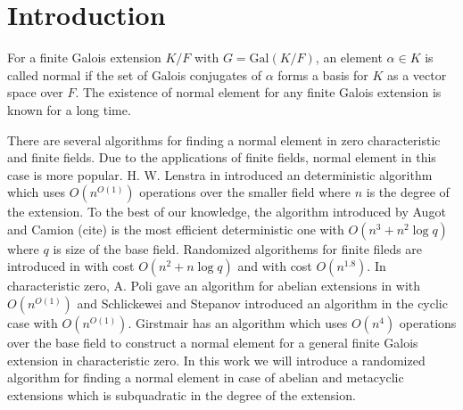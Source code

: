 \documentclass[sigconf]{acmart}
\theoremstyle{acmplain}
\begin{document}
\maketitle

\section{Introduction}

For a finite Galois extension $K/F$ with $G = \mathrm{Gal}(K/F)$, an element $\alpha \in K$
is called normal if the set of Galois conjugates of $\alpha$ forms a basis for $K$ as a
 vector space over $F$. The existence of normal element for any finite Galois extension is 
 known for a long time.

There are several algorithms for finding a normal element in zero characteristic and finite fields. Due to the applications of
finite fields, normal element in this case is more popular. H. W. Lenstra in \cite{LenstraNormal} introduced an deterministic 
algorithm which uses $O(n^{O(1)})$ operations over the smaller field where $n$ is the degree of the extension. To the best of
our knowledge, the algorithm introduced by Augot and Camion (cite) is the most efficient deterministic one with $O(n^3+n^2\log q)$
where $q$ is size of the base field. Randomized algorithems for finite fileds are introduced in \cite{Giesbrecht} with cost
$O(n^2+n\log q)$ and \cite{Kaltoefen} with cost $O(n^{1.8})$. In characteristic zero, A. Poli gave an algorithm for abelian extensions in \cite{Poli} with $O(n^{O(1)})$ and Schlickewei and Stepanov introduced an algorithm in the cyclic case with
$O(n^{O(1)})$. Girstmair has an algorithm which uses $O(n^4)$ operations over the base field to construct a normal element for 
a general finite Galois extension in characteristic zero. In this work we will introduce a randomized algorithm for finding a
normal element in case of abelian and metacyclic extensions which is subquadratic in the degree of the extension.
\end{document}
